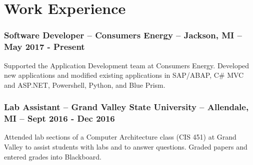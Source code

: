 \documentclass{article}
\begin{document}
	\section*{Work Experience}

    \subsubsection{Software Developer -- Consumers Energy -- Jackson, MI -- May 2017 - Present}
      \begin{addmargin}[1em]{0em}
        Supported the Application Development team at Consumers Energy. Developed new applications and modified existing applications in SAP/ABAP, C\# MVC and ASP.NET, Powershell, Python, and Blue Prism.
      \end{addmargin}


		\subsubsection{Lab Assistant -- Grand Valley State University -- Allendale, MI -- Sept 2016 - Dec 2016}
			\begin{addmargin}[1em]{0em}
				Attended lab sections of a Computer Architecture class (CIS 451) at Grand Valley to assist students with labs and to answer questions. Graded papers and entered grades into Blackboard.
			\end{addmargin}

\end{document}
